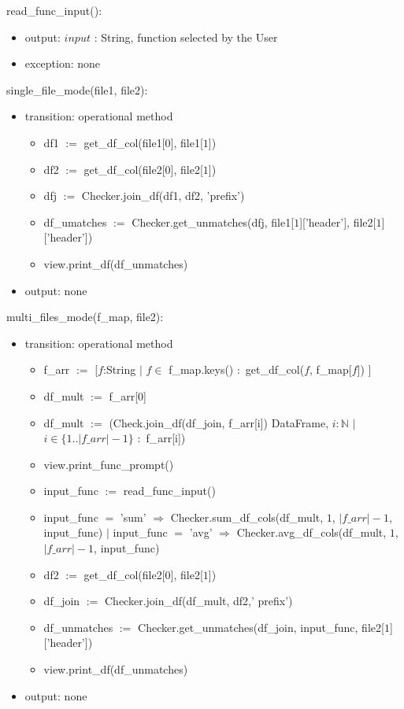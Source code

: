 \documentclass[12pt]{article}
\begin{document}
\noindent read\_func\_input():
\begin{itemize}
  \item output: $input$ : String, function selected by the User
  \item exception: none
\end{itemize}

\noindent single\_file\_mode(file1, file2):
\begin{itemize}
  \item transition: operational method 
  \begin{itemize}[\null]
    \item df1 $:=$ get\_df\_col(file1[$0$], file1[$1$])
    \item df2 $:=$ get\_df\_col(file2[$0$], file2[$1$])
    \item dfj $:=$ Checker.join\_df(df1, df2, 'prefix') 
    \item df\_umatches $:=$ Checker.get\_unmatches(dfj, file1[$1$]['header'], file2[$1$]['header'])
    \item view.print\_df(df\_unmatches)
  \end{itemize}
  \item output: none
\end{itemize}

\noindent multi\_files\_mode(f\_map, file2):
\begin{itemize}
  \item transition: operational method 
  \begin{itemize}[\null]
    \item f\_arr $:=$ [$f$:String $|$ $f \in$ f\_map.keys() $:$ get\_df\_col($f$, f\_map[$f$]) ]
    \item df\_mult $:=$ f\_arr[$0$]
    \item df\_mult $:=$ (Check.join\_df(df\_join, f\_arr[i]) DataFrame, 
    $i:\mathbb{N}$ $|$ $i \in \{1..|f\_arr|-1\}$ $:$ f\_arr[i])
    \item view.print\_func\_prompt()
    \item input\_func $:=$ read\_func\_input()
    \item input\_func $=$ 'sum' $\Rightarrow$ Checker.sum\_df\_cols(df\_mult, $1$, $|f\_arr|-1$, input\_func) $|$  
    input\_func $=$ 'avg' $\Rightarrow$ Checker.avg\_df\_cols(df\_mult, $1$, $|f\_arr|-1$, input\_func)
    \item df2 $:=$ get\_df\_col(file2[$0$], file2[$1$])
    \item df\_join $:=$ Checker.join\_df(df\_mult, df2,' prefix') 
    \item df\_unmatches $:=$ Checker.get\_unmatches(df\_join, input\_func, file2[$1$]['header'])
    \item view.print\_df(df\_unmatches)
  \end{itemize}
  \item output: none
\end{itemize}
\end{document}
